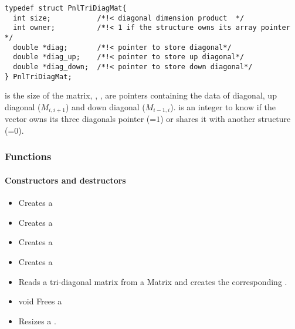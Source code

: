\begin{verbatim}
typedef struct PnlTriDiagMat{
  int size;           /*!< diagonal dimension product  */
  int owner;          /*!< 1 if the structure owns its array pointer */
  double *diag;       /*!< pointer to store diagonal*/
  double *diag_up;    /*!< pointer to store up diagonal*/
  double *diag_down;  /*!< pointer to store down diagonal*/
} PnlTriDiagMat;
\end{verbatim}
 is the size of the matrix, , ,   are pointers containing the
data of diagonal, up diagonal ($M_{i, i+1}$) and  down diagonal ($M_{i-1, i}$).
 is an integer to know if the vector owns its three diagonals
pointer (=$1$) or shares it with another structure (=$0$).

\subsubsection{Functions}
\paragraph{Constructors and destructors}
\begin{itemize}
\item 
  \sshortdescribe Creates a   
\item {}
  \sshortdescribe Creates a   
\item {}
  \sshortdescribe Creates a   
\item {}
  \sshortdescribe Creates a   
\item {}
  \sshortdescribe Reads a tri-diagonal matrix from a Matrix and creates
  the corresponding .
\item void 
  \sshortdescribe Frees a   
\item {}
  \sshortdescribe Resizes a .  
\end{itemize}
